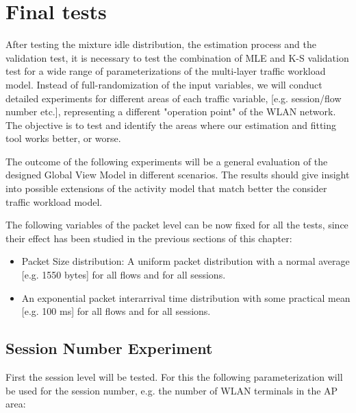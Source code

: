 \section{Final tests}
After testing the mixture idle distribution, the estimation process and the validation test, it is necessary to test the combination of \acs{MLE} and \acs{K-S} validation test for a wide range of parameterizations of the multi-layer traffic workload model. Instead of full-randomization of the input variables, we will conduct detailed experiments for different areas of each traffic variable, [e.g. session/flow number etc.], representing a different "operation point" of the \acs{WLAN} network. 
The objective is to test and identify the areas where our estimation and fitting tool works better, or worse.




The outcome of the following experiments will be a general evaluation of the designed Global View Model in different scenarios. The results should give insight into possible extensions of the activity model that match better the consider traffic workload model.


The following variables of the packet level can be now fixed for all the tests, since their effect has been studied in the previous sections of this chapter:

\begin{itemize}
\item Packet Size distribution: A uniform packet distribution with a normal average [e.g. 1550 bytes] for all flows and for all sessions.
\item An exponential packet interarrival time distribution with some practical mean [e.g. 100 ms] for all flows and for all sessions.
\end{itemize}

\subsection{Session Number Experiment}
First the session level will be tested. For this the following parameterization will be used for the session number, e.g. the number of \acs{WLAN} terminals in the \acs{AP} area:

